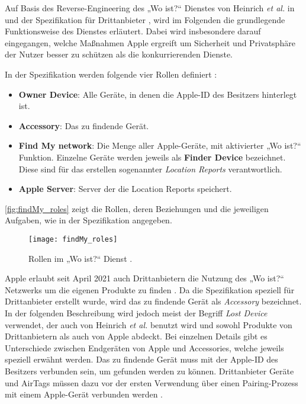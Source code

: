 Auf Basis des Reverse-Engineering des „Wo ist?“ Dienstes von Heinrich \textit{et al.} in \cite{Heinrich_FindMy} und der Spezifikation für Drittanbieter \cite{Apple_FindMySpec}, wird im Folgenden die grundlegende Funktionsweise des Dienstes erläutert.
Dabei wird insbesondere darauf eingegangen, welche Maßnahmen Apple ergreift um Sicherheit und Privatsphäre der Nutzer besser zu schützen als die konkurrierenden Dienste. 

In der Spezifikation werden folgende vier Rollen definiert \cite{Apple_FindMySpec}:
\begin{itemize}
    \item \textbf{Owner Device}: Alle Geräte, in denen die Apple-ID des Besitzers hinterlegt ist.
    \item \textbf{Accessory}: Das zu findende Gerät.
    \item \textbf{Find My network}: Die Menge aller Apple-Geräte, mit aktivierter „Wo ist?“ Funktion. Einzelne Geräte werden jeweils als \textbf{Finder Device} bezeichnet. Diese sind für das erstellen sogenannter \textit{Location Reports} verantwortlich.
    \item \textbf{Apple Server}: Server der die Location Reports speichert.
\end{itemize}
\autoref{fig:findMy_roles} zeigt die Rollen, deren Beziehungen und die jeweiligen Aufgaben, wie in der Spezifikation angegeben.
\begin{figure}
    \centering
    \texttt{[image: findMy\_roles]}
    \caption{Rollen im „Wo ist?“ Dienst \cite{Apple_FindMySpec}.}
    \label{fig:findMy_roles}
\end{figure}
Apple erlaubt seit April 2021 auch Drittanbietern die Nutzung des „Wo ist?“ Netzwerks um die eigenen Produkte zu finden \cite{Apple_FindMy3rdParty}.
Da die Spezifikation speziell für Drittanbieter erstellt wurde, wird das zu findende Gerät als \textit{Accessory} bezeichnet.
In der folgenden Beschreibung wird jedoch meist der Begriff \textit{Lost Device} verwendet, der auch von Heinrich \textit{et al.} \cite{Heinrich_FindMy} benutzt wird und sowohl Produkte von Drittanbietern als auch von Apple abdeckt.
Bei einzelnen Details gibt es Unterschiede zwischen Endgeräten von Apple und Accessories, welche jeweils speziell erwähnt werden.
Das zu findende Gerät muss mit der Apple-ID des Besitzers verbunden sein, um gefunden werden zu können.
Drittanbieter Geräte und AirTags müssen dazu vor der ersten Verwendung über einen Pairing-Prozess mit einem Apple-Gerät verbunden werden \cite{Apple_FindMySpec}.


